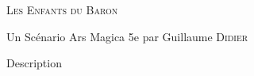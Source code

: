 \begin{center}
\vfill
    {\Large\scshape Les Enfants du Baron\par}
    \vspace{0.5cm}
{Un Scénario Ars Magica 5e par Guillaume \textsc{Didier}\par}
    \vfill
    {\LARGE\bfseries \magusname \par}



\vfill
    \begin{center}
        \parbox{.8\textwidth}{
            Description}
    \end{center}
\vfill
\end{center}
\pagebreak

\shortsheet{}

